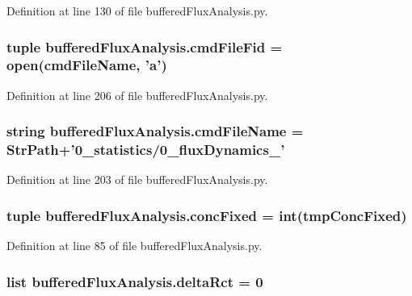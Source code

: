 Definition at line 130 of file buffered\-Flux\-Analysis.\-py.

\hypertarget{namespacebuffered_flux_analysis_a6b17587fb0cc6eb8ae770e1dbc5b1d97}{
\subsubsection[{cmd\-File\-Fid}]{\setlength{\rightskip}{0pt plus 5cm}tuple buffered\-Flux\-Analysis.\-cmd\-File\-Fid = open({\bf cmd\-File\-Name}, '{\bf a}')}}\label{namespacebuffered_flux_analysis_a6b17587fb0cc6eb8ae770e1dbc5b1d97}


Definition at line 206 of file buffered\-Flux\-Analysis.\-py.

\hypertarget{namespacebuffered_flux_analysis_af2f4a5ec3f690f7a60ea69a5cb208359}{
\subsubsection[{cmd\-File\-Name}]{\setlength{\rightskip}{0pt plus 5cm}string buffered\-Flux\-Analysis.\-cmd\-File\-Name = {\bf Str\-Path}+'0\-\_\-statistics/0\-\_\-flux\-Dynamics\-\_\-'}}\label{namespacebuffered_flux_analysis_af2f4a5ec3f690f7a60ea69a5cb208359}


Definition at line 203 of file buffered\-Flux\-Analysis.\-py.

\hypertarget{namespacebuffered_flux_analysis_a532dc433988bcc35543c129c92aa9e53}{
\subsubsection[{conc\-Fixed}]{\setlength{\rightskip}{0pt plus 5cm}tuple buffered\-Flux\-Analysis.\-conc\-Fixed = int(tmp\-Conc\-Fixed)}}\label{namespacebuffered_flux_analysis_a532dc433988bcc35543c129c92aa9e53}


Definition at line 85 of file buffered\-Flux\-Analysis.\-py.

\hypertarget{namespacebuffered_flux_analysis_ad074bf5da40fa7fb7978db66744aec56}{
\subsubsection[{delta\-Rct}]{\setlength{\rightskip}{0pt plus 5cm}list buffered\-Flux\-Analysis.\-delta\-Rct = 0}}\label{namespacebuffered_flux_analysis_ad074bf5da40fa7fb7978db66744aec56}


